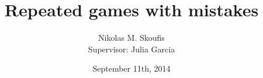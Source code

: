 \documentclass[a4paper,11pt]{article}
\begin{document}
\title{Repeated games with mistakes}
\author{Nikolas M. Skoufis \\ Supervisor: Julia Garcia}
\date{September 11th, 2014}
\end{document}
